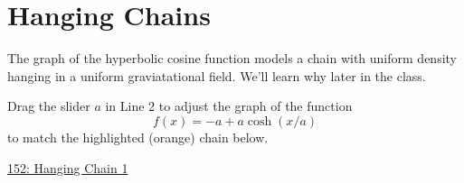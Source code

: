 \documentclass{ximera}
\begin{document}
\section{Hanging Chains}
The graph of the hyperbolic cosine function models a chain with uniform density hanging in a uniform graviatational field. We'll learn why later in the class.

Drag the slider $a$ in Line 2 to adjust the graph of the function
\[
     f(x) = -a + a\cosh(x/a)
\]
to match the highlighted (orange) chain below.

\begin{onlineOnly}
    \begin{center}
\end{center}
\end{onlineOnly}

\href{https://www.desmos.com/calculator/tj3dz2cnf0}{152: Hanging Chain 1}
\end{document}
